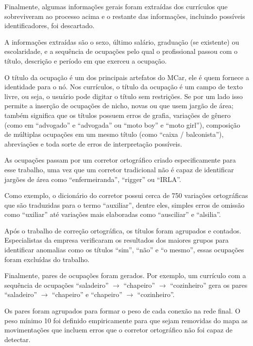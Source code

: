 \documentclass[
  article,
  11pt,
  a4paper,
  english,
  brazil,
  sumario=tradicional]{abntex2}
\begin{document}
Finalmente, algumas informações gerais foram extraídas dos currículos que sobreviveram ao processo acima e o restante das informações, incluindo possíveis identificadores, foi descartado.

A informações extraídas são o sexo, último salário, graduação (se existente) ou escolaridade, e a sequência de ocupações pelo qual o profissional passou com o título, descrição e período em que exerceu a ocupação.

O título da ocupação é um dos principais artefatos do MCar, ele é quem fornece a identidade para o nó. Nos currículos, o título da ocupação é um campo de texto livre, ou seja, o usuário pode digitar o título sem restrições. Se por um lado isso permite a inserção de ocupações de nicho, novas ou que usem jargão de área; também significa que os títulos possuem erros de grafia, variações de gênero (como em \enquote{advogado} e \enquote{advogada} ou \enquote{moto boy} e \enquote{moto girl}), composição de múltiplas ocupações em um mesmo título (como \enquote{caixa / balconista}), abreviações e toda sorte de erros de interpretação possíveis.

As ocupações passam por um corretor ortográfico criado especificamente para esse trabalho, uma vez que um corretor tradicional não é capaz de identificar jargões de área como \enquote{enfermeiranda}, \enquote{rigger} ou \enquote{IRLA}.

Como exemplo, o dicionário do corretor possui cerca de 750 variações ortográficas que são traduzidas para o termo \enquote{auxiliar}, dentre eles, simples erros de omissão como \enquote{uxiliar} até variações mais elaboradas como \enquote{ausciliar} e \enquote{alsilia}.

Após o trabalho de correção ortográfica, os títulos foram agrupados e contados. Especialistas da empresa verificaram os resultados dos maiores grupos para identificar anomalias como os títulos \enquote{sim}, \enquote{não} e \enquote{o mesmo}, essas ocupações foram excluídas do trabalho.

Finalmente, pares de ocupações foram gerados. Por exemplo, um currículo com a sequência de ocupações \enquote{saladeiro} $\to$ \enquote{chapeiro} $\to$ \enquote{cozinheiro} gera os pares \enquote{saladeiro} $\to$ \enquote{chapeiro} e \enquote{chapeiro} $\to$ \enquote{cozinheiro}.

Os pares foram agrupados para formar o peso de cada conexão na rede final. O peso mínimo 10 foi definido empiricamente para que sejam removidas do mapa as movimentações que incluem erros que o corretor ortográfico não foi capaz de detectar.
\end{document}
